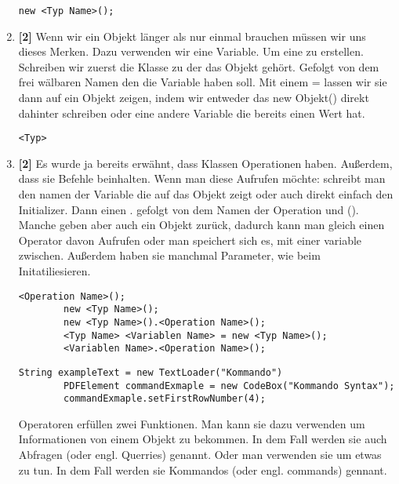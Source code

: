 \begin{enumerate}
          \begin{lstlisting}[title=\textbf{Konstruktor Syntax},firstnumber=5]
        new <Typ Name>();
    \end{lstlisting}
    \item \textbf{[2]} Wenn wir ein Objekt länger als nur einmal brauchen müssen wir uns dieses Merken. Dazu verwenden wir eine Variable. Um eine zu erstellen. Schreiben wir zuerst die Klasse zu der das Objekt gehört. Gefolgt von dem frei wälbaren Namen den die Variable haben soll. Mit einem = lassen wir sie dann auf ein Objekt zeigen, indem wir entweder das new Objekt() direkt dahinter schreiben oder eine andere
          Variable die bereits einen Wert hat.
          \begin{lstlisting}[title=\textbf{Variablen Syntax}]
    <Typ>
          \end{lstlisting}

    \item \textbf{[2]} Es wurde ja bereits erwähnt, dass Klassen Operationen haben. Außerdem, dass sie  Befehle beinhalten. Wenn man diese Aufrufen möchte: schreibt man den namen der Variable die auf das Objekt zeigt oder auch direkt einfach den Initializer. Dann einen . gefolgt von dem Namen der Operation und (). Manche geben aber auch ein Objekt zurück, dadurch kann man gleich einen Operator davon Aufrufen oder man speichert sich es, mit einer variable zwischen. Außerdem haben sie manchmal Parameter, wie beim Initatiliesieren.
          \begin{lstlisting}[title=\textbf{Kommando Syntax},firstnumber=4]
        <Operation Name>();
        new <Typ Name>();
        new <Typ Name>().<Operation Name>();
        <Typ Name> <Variablen Name> = new <Typ Name>();
        <Variablen Name>.<Operation Name>();
            \end{lstlisting}
          \begin{lstlisting}[title=\textbf{Kommando Beispiel},firstnumber=4]
        String exampleText = new TextLoader("Kommando")
        PDFElement commandExmaple = new CodeBox("Kommando Syntax");
        commandExmaple.setFirstRowNumber(4);
              \end{lstlisting}
          \begin{Infobox}[Operationen]
              Operatoren erfüllen zwei Funktionen. Man kann sie dazu verwenden um Informationen von einem Objekt zu bekommen.
              In dem Fall werden sie auch Abfragen (oder engl. Querries) genannt.
              Oder man verwenden sie um etwas zu tun. In dem Fall werden sie Kommandos (oder engl. commands) gennant.
          \end{Infobox}


\end{enumerate}
